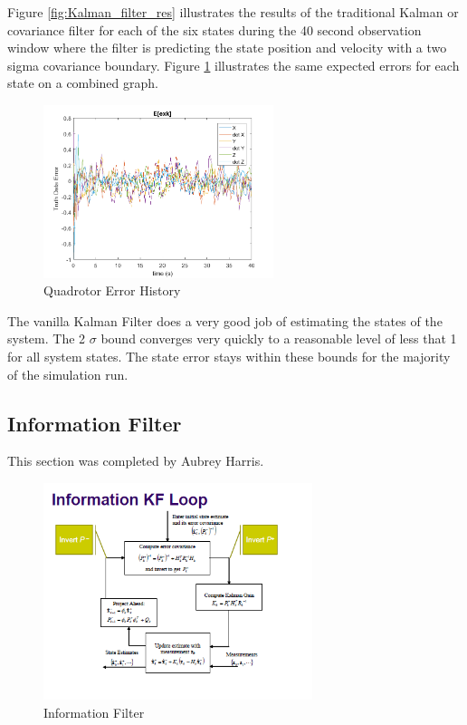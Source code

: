 \documentclass[12pt]{extarticle}
\begin{document}
{{Figure \ref{fig:Kalman_filter_res} illustrates the results of the traditional Kalman or covariance filter for each of the six states during the 40 second observation window where the filter is predicting the state position and velocity with a two sigma covariance boundary. Figure \ref{fig:Kalman_filter_err} illustrates the same expected errors for each state on a combined graph.

\begin{figure}[h!]
    \centering
    \includegraphics[width=0.6\textwidth]{Images/errors.png}
    \caption{Quadrotor Error History}
    \label{fig:Kalman_filter_err}
\end{figure}


The vanilla Kalman Filter does a very good job of estimating the states of the system. The 2 $\sigma$ bound converges very quickly to a reasonable level of less that 1 for all system states. The state error stays within these bounds for the majority of the simulation run.



}
\subsection{Information Filter}{
This section was completed by Aubrey Harris.

\begin{figure}[h!]
   \centering
    \includegraphics[width=0.7\textwidth,clip=true,trim={0cm 0.7cm 0cm 0}]{Images/Information}
    \caption{Information Filter}\label{fig:Info_filt}
\end{figure}

}}
\end{document}
